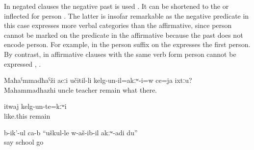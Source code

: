 In negated clauses the negative past   is used . It can be shortened to the    or inflected for person . The latter is insofar remarkable as the negative predicate in this case expresses more verbal categories than the affirmative, since person cannot be marked on the predicate in the affirmative because the past  does not encode person. For example, in  the person suffix on the  expresses the first person. By contrast, in affirmative clauses with the same verb form person cannot be expressed , .
%
\begin{exe}
	\ex	\label{ex:Mahammadhazhi was not working as a teacher or what there (in Sanzhi) analytic}
	\gll	Maħaˁmmadħaˁži	acːi	učitil-li	kelg-un-il=akːʷ-i=w	ce=ja	ixtːu?\\
		Mahammadhazhi	uncle	teacher	remain	what	there.\\
	\glt	{} 
	
	\ex	\label{ex:It was not like this analytic}
	\gll	itwaj	kelg-un-te=kːʷi\\
		like.this	remain\\
	\glt	{}

	\ex	\label{ex:‎‎(The wolf) said, I did not go to school analytic}
	\gll	b-ik'-ul	ca-b	``uškul-le	w-aš-ib-il		akːʷ-adi	du''\\
		say		school	go		\\
	\glt	{}

\end{exe}
